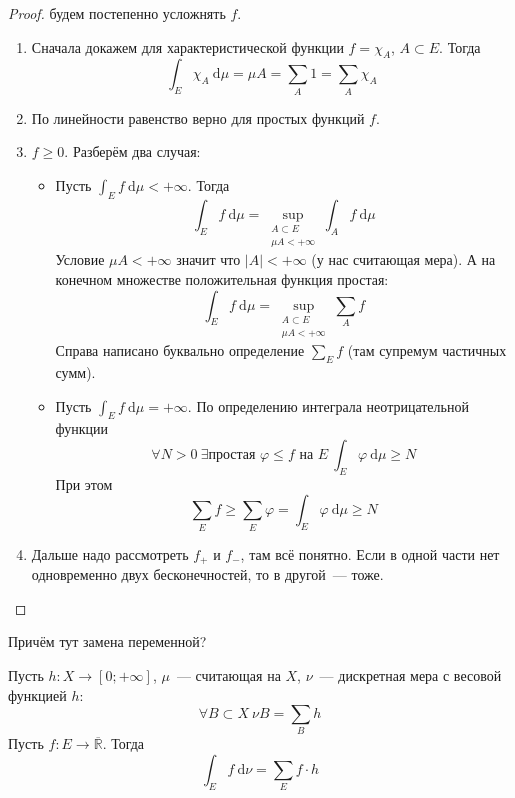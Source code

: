 \documentclass{article}
\let\tmp\varphi
\let\varphi\phi
\let\phi\tmp
\begin{document}
    \begin{proof}
        будем постепенно усложнять $f$.
        \begin{enumerate}
            \item Сначала докажем для характеристической функции $f=\chi_A$, $A\subset E$. Тогда
            $$
            \int_E\chi_A~\mathrm d\mu=\mu A=\sum\limits_A1=\sum\limits_A\chi_A
            $$
            \item По линейности равенство верно для простых функций $f$.
            \item $f\geqslant0$. Разберём два случая:
            \begin{itemize}
                \item Пусть $\int_Ef~\mathrm d\mu<+\infty$. Тогда
                $$
                \int_Ef~\mathrm d\mu=\sup\limits_{\substack{A\subset E\\\mu A<+\infty}}\int_Af~\mathrm d\mu
                $$
                Условие $\mu A<+\infty$ значит что $|A|<+\infty$ (у нас считающая мера). А на конечном множестве положительная функция простая:
                $$
                \int_Ef~\mathrm d\mu=\sup\limits_{\substack{A\subset E\\\mu A<+\infty}}\sum\limits_Af
                $$
                Справа написано буквально определение $\sum\limits_Ef$ (там супремум частичных сумм).
                \item Пусть $\int_Ef~\mathrm d\mu=+\infty$. По определению интеграла неотрицательной функции
                $$
                \forall N>0~\exists\text{простая }\phi\leqslant f\text{ на }E~\int_E\phi~\mathrm d\mu\geqslant N
                $$
                При этом
                $$
                \sum\limits_Ef\geqslant\sum\limits_E\phi=\int_E\phi~\mathrm d\mu\geqslant N
                $$
            \end{itemize}
            \item Дальше надо рассмотреть $f_+$ и $f_-$, там всё понятно. Если в одной части нет одновременно двух бесконечностей, то в другой~--- тоже.
        \end{enumerate}
    \end{proof}
    \begin{remark}
        Причём тут замена переменной?
    \end{remark}
    \begin{corollary}
        Пусть $h\colon X\to[0;+\infty]$, $\mu$~--- считающая на $X$, $\nu$~--- дискретная мера с весовой функцией $h$:
        $$
        \forall B\subset X~\nu B=\sum\limits_Bh
        $$
        Пусть $f\colon E\to\overline{\mathbb R}$. Тогда
        $$
        \int_Ef~\mathrm d\nu=\sum\limits_Ef\cdot h
        $$
    \end{corollary}
\end{document}
